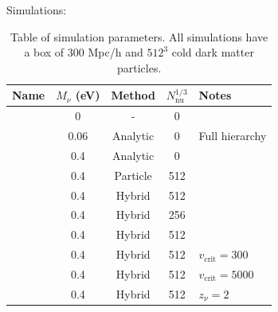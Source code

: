 \documentclass[useAMS, usenatbib]{mnras}
\begin{document}
Simulations:
\begin{table}
\begin{center}
\begin{tabular}{|l|c|c|c|l|}
\hline
    Name & $M_\nu$ (eV) & Method & $N_\mathrm{nu}^{1/3}$ & Notes \\
\hline
    &       0             &    -          & 0         &    \\
    &     0.06            &   Analytic    & 0         &  Full hierarchy  \\
    &     0.4             &   Analytic    & 0         &    \\
    &     0.4             &   Particle    & 512       &    \\
    &     0.4             &   Hybrid      & 512       &    \\
    &     0.4             &   Hybrid      & 256       &    \\
    &     0.4             &   Hybrid      & 512       &    \\
    &     0.4             &   Hybrid      & 512       &  $v_\mathrm{crit}=300$  \\
    &     0.4             &   Hybrid      & 512       &  $v_\mathrm{crit}=5000$  \\
    &     0.4             &   Hybrid      & 512       &  $z_\nu = 2$  \\
\hline
\end{tabular}
\end{center}
\caption{Table of simulation parameters. All simulations have a box of $300$ Mpc/h
and $512^3$ cold dark matter particles.
}
\label{tab:simulations}
\end{table}
\end{document}
